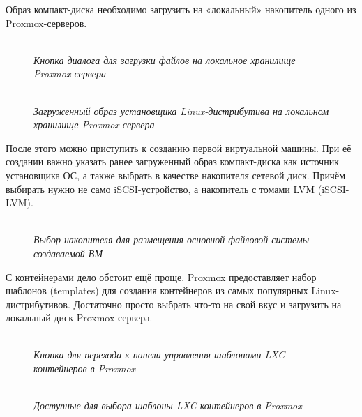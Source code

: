 \documentclass[14pt, a4paper]{article}
\begin{document}
Образ компакт-диска необходимо загрузить на «локальный» накопитель одного из Proxmox-серверов.

\begin{figure}[h]
    \centering
    \\
    \small\textit{Кнопка диалога для загрузки файлов на локальное хранилище Proxmox-сервера}  
    \label{framework} 
\end{figure}

\begin{figure}[h]
    \centering
    \\
    \small\textit{Загруженный образ установщика Linux-дистрибутива на локальном хранилище Proxmox-сервера}  
    \label{framework} 
\end{figure}

После этого можно приступить к созданию первой виртуальной машины. При её создании важно
указать ранее загруженный образ компакт-диска как источник установщика ОС, а также выбрать в
качестве накопителя сетевой диск. Причём выбирать нужно не само iSCSI-устройство, а накопитель с
томами LVM (iSCSI-LVM).

\begin{figure}[h]
    \centering
    \\
    \small\textit{Выбор накопителя для размещения основной файловой системы создаваемой ВМ}  
    \label{framework} 
\end{figure}

С контейнерами дело обстоит ещё проще. Proxmox предоставляет набор шаблонов (templates) для
создания контейнеров из самых популярных Linux-дистрибутивов. Достаточно просто выбрать что-то
на свой вкус и загрузить на локальный диск Proxmox-сервера.

\newpage

\begin{figure}[h]
    \centering
    \\
    \small\textit{Кнопка для перехода к панели управления шаблонами LXC-контейнеров в Proxmox}  
    \label{framework} 
\end{figure}

\begin{figure}[h]
    \centering
    \\
    \small\textit{Доступные для выбора шаблоны LXC-контейнеров в Proxmox}  
    \label{framework} 
\end{figure}
\end{document}
